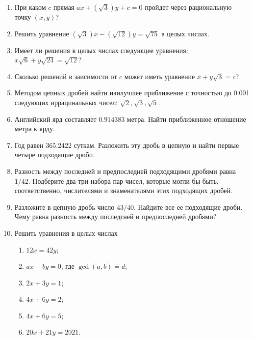 \begin{enumerate}
\item При каком $c$ прямая $ax+(\sqrt 3)y+c=0$ пройдет через рациональную точку $(x,y)$?
\item Решить уравнение $(\sqrt 3)x-(\sqrt{12})y = \sqrt{75}$ в целых числах.
\item Имеет ли решения в целых числах следующее уравнения: $x\sqrt 6+y\sqrt{24}=\sqrt{12}$?
\item Сколько решений в заисимости от $c$ может иметь уравнение $x+y\sqrt 3=c$?
\item Методом цепных дробей найти наилучшее приближение с точностью до 0.001 следующих иррацинальных чисел: $\sqrt 2, \sqrt 3, \sqrt 5$.
\item Английский ярд составляет $0.914383$ метра. Найти приближенное отношение метра к ярду.
\item Год равен $365.2422$ суткам. Разложить эту дробь в цепную и найти первые четыре подходящие дроби.
\item Разность между последней и предпоследней подходящими дробями равна $1/42$. Подберите два-три набора пар чисел, которые могли бы быть, соответственно, числителями и знаменателями этих подходящих дробей.
\item Разложите в цепную дробь число $43/40$. Найдите все ее подходящие дроби. Чему равна разность между последгней и предпоследней дробями?
\item Решить уравнения в целых числах
\begin{enumerate}
\item $12x = 42y$;
\item $ax + by = 0$, где $\gcd(a, b) = d$;
\item $2x + 3y = 1$;
\item $4x + 6y = 2$;
\item $4x + 6y = 5$;
\item $20x + 21y = 2021$.
\end{enumerate}
\end{enumerate}

